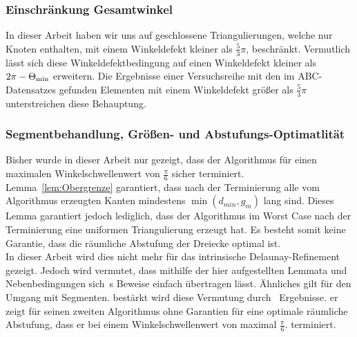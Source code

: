 \subsubsection{Einschränkung Gesamtwinkel}
In dieser Arbeit haben wir uns auf geschlossene Triangulierungen, welche nur Knoten enthalten, mit einem Winkeldefekt kleiner als $ \frac{5}{3}\pi$, beschränkt. Vermutlich lässt sich diese Winkeldefektbedingung auf  einen Winkeldefekt kleiner als $2\pi - \kleinsterWinkel*$ erweitern. 
Die Ergebnisse einer Versuchsreihe mit den im  ABC-Datensatzes gefunden Elementen  mit einem Winkeldefekt größer als $\frac{5}{3}\pi$   unterstreichen diese Behauptung.
 


\subsubsection{Segmentbehandlung, Größen- und Abstufungs-Optimatlität}
Bisher wurde in dieser Arbeit nur gezeigt, dass der Algorithmus für einen maximalen Winkelschwellenwert von  $\frac{\pi}{6}$ sicher terminiert. Lemma~\ref{lem:Obergrenze} garantiert, dass nach der Terminierung alle vom Algorithmus erzeugten Kanten mindestens $\min(d_{min},g_{m})$ lang sind. Dieses Lemma garantiert jedoch lediglich, dass der Algorithmus im Worst Case nach der Terminierung eine uniformen Triangulierung erzeugt hat. Es besteht somit keine Garantie, dass die räumliche Abstufung der Dreiecke optimal ist.\\
In dieser Arbeit wird dies nicht mehr für das intrinsische Delaunay-Refinement gezeigt. Jedoch wird vermutet, dass mithilfe der hier aufgestellten Lemmata und Nebenbedingungen sich~\citeauthor{ruppert:1995:delaunay}s Beweise einfach übertragen lässt. Ähnliches gilt für den Umgang mit Segmenten. bestärkt wird diese Vermutung durch~\citet{chew:1993:guaranteed} Ergebnisse. er zeigt für seinen zweiten Algorithmus ohne Garantien für eine optimale  räumliche Abstufung, dass er bei einem Winkelschwellenwert von maximal $\frac{\pi}{6}$. terminiert.

 
